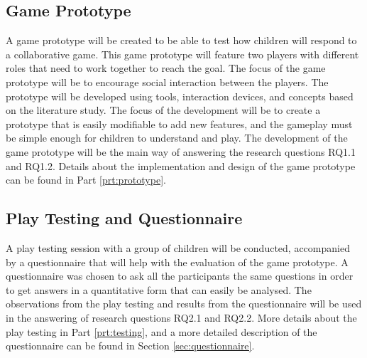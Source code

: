 \subsection{Game Prototype}
A game prototype will be created to be able to test how children will respond to a collaborative game. This game prototype will feature two players with different roles that need to work together to reach the goal. The focus of the game prototype will be to encourage social interaction between the players. The prototype will be developed using tools, interaction devices, and concepts based on the literature study. The focus of the development will be to create a prototype that is easily modifiable to add new features, and the gameplay must be simple enough for children to understand and play. The development of the game prototype will be the main way of answering the research questions RQ1.1 and RQ1.2. Details about the implementation and design of the game prototype can be found in Part \ref{prt:prototype}.

\subsection{Play Testing and Questionnaire}
A play testing session with a group of children will be conducted, accompanied by a questionnaire that will help with the evaluation of the game prototype. A questionnaire was chosen to ask all the participants the same questions in order to get answers in a quantitative form that can easily be analysed. The observations from the play testing and results from the questionnaire will be used in the answering of research questions RQ2.1 and RQ2.2. More details about the play testing in Part \ref{prt:testing}, and a more detailed description of the questionnaire can be found in Section \ref{sec:questionnaire}.



